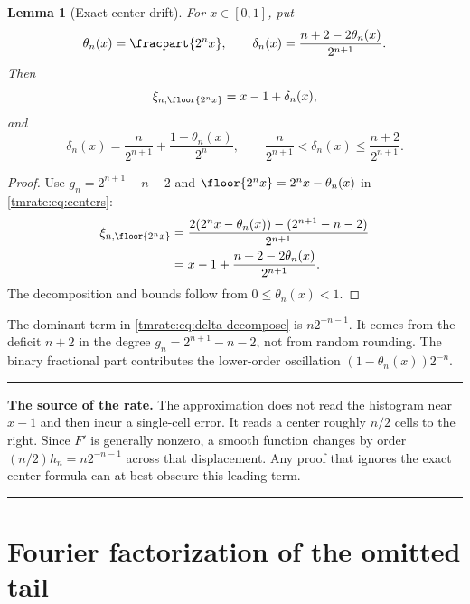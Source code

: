 \documentclass[11pt,oneside]{article}
\newtheorem{lemma}[theorem]{Lemma}
\theoremstyle{definition}
\theoremstyle{remark}
\newenvironment{boxedremark}{%
  \par\smallskip\noindent\begin{center}\begin{minipage}{0.94\textwidth}%
  \color{black}\hrule\vspace{0.6em}\small
}{%
  \vspace{0.6em}\hrule\end{minipage}\end{center}\smallskip
}
\begin{document}
\begin{lemma}[Exact center drift]
\label{tmrate:lem:center-drift}
For $x\in[0,1]$, put
\begin{equation}
 \theta_n(x)=\fracpart{2^n x},
 \qquad
 \delta_n(x)=\frac{n+2-2\theta_n(x)}{2^{n+1}}.            \label{tmrate:eq:delta-def}
\end{equation}
Then
\begin{equation}
 \xi_{n,\floor{2^n x}}=x-1+\delta_n(x),                   \label{tmrate:eq:center-drift}
\end{equation}
and
\begin{equation}
 \delta_n(x)=\frac{n}{2^{n+1}}+
              \frac{1-\theta_n(x)}{2^n},
 \qquad
 \frac{n}{2^{n+1}}<\delta_n(x)\le\frac{n+2}{2^{n+1}}.    \label{tmrate:eq:delta-decompose}
\end{equation}
\end{lemma}

\begin{proof}
Use $g_n=2^{n+1}-n-2$ and
$\floor{2^n x}=2^n x-\theta_n(x)$ in \eqref{tmrate:eq:centers}:
\begin{align*}
 \xi_{n,\floor{2^n x}}
 &=\frac{2(2^n x-\theta_n(x))-(2^{n+1}-n-2)}{2^{n+1}}\\
 &=x-1+\frac{n+2-2\theta_n(x)}{2^{n+1}}.
\end{align*}
The decomposition and bounds follow from $0\le\theta_n(x)<1$.
\end{proof}

The dominant term in \eqref{tmrate:eq:delta-decompose} is $n2^{-n-1}$.  It comes from
the deficit $n+2$ in the degree $g_n=2^{n+1}-n-2$, not from random rounding.
The binary fractional part contributes the lower-order oscillation
$(1-\theta_n(x))2^{-n}$.

\begin{boxedremark}
\textbf{The source of the rate.}
The approximation does not read the histogram near $x-1$ and then incur a
single-cell error.  It reads a center roughly $n/2$ cells to the right.  Since
$F'$ is generally nonzero, a smooth function changes by order
$(n/2)h_n=n2^{-n-1}$ across that displacement.  Any proof that ignores the exact
center formula can at best obscure this leading term.
\end{boxedremark}

\section{Fourier factorization of the omitted tail}
\label{tmrate:sec:tail-kernel}
\end{document}
